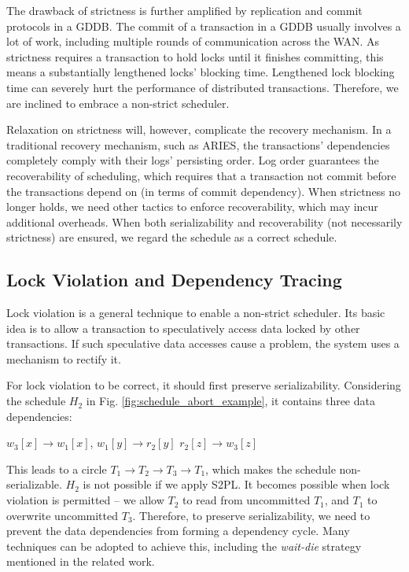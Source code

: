 \documentclass[conference]{IEEEtran}
\begin{document}
The drawback of strictness is further amplified by replication and commit protocols in a GDDB.
The commit of a transaction in a GDDB usually involves a lot of work, including multiple rounds of communication across the WAN.
As strictness requires a transaction to hold locks until it finishes committing, this means a substantially lengthened locks' blocking time.
Lengthened lock blocking time can severely hurt the performance of distributed transactions.
Therefore, we are inclined to embrace a non-strict scheduler.

Relaxation on strictness will, however, complicate the recovery mechanism.
In a traditional recovery mechanism, such as ARIES\cite{ARIES:journals/tods/MohanHLPS92}, the transactions' dependencies completely comply with their logs' persisting order.
Log order guarantees the recoverability of scheduling, which requires that a transaction not commit before the transactions depend on (in terms of commit dependency).
When strictness no longer holds, we need other tactics to enforce recoverability, which may incur additional overheads.
When both serializability and recoverability (not necessarily strictness) are ensured, we regard the schedule as a correct schedule.


\subsection{Lock Violation and Dependency Tracing}

Lock violation is a general technique to enable a non-strict scheduler.
Its basic idea is to allow a transaction to speculatively access data locked by other transactions.
If such speculative data accesses cause a problem, the system uses a mechanism to rectify it.

For lock violation to be correct, it should first preserve serializability.
Considering the schedule ${H_2}$ in Fig. \ref{fig:schedule_abort_example},
it contains three data dependencies:

\begin{center}
${w_3[x] \rightarrow w_1[x]}$,
${w_1[y] \rightarrow r_2[y]}$
${r_2[z] \rightarrow w_3[z]}$
\end{center}

This leads to a circle ${T_1 \rightarrow T_2 \rightarrow T_3 \rightarrow T_1}$, which makes the schedule non-serializable.
${H_2}$ is not possible if we apply S2PL.
It becomes possible when lock violation is permitted -- we allow ${T_2}$ to read from uncommitted ${T_1}$, and ${T_1}$ to overwrite uncommitted ${T_3}$.
Therefore, to preserve serializability, we need to prevent the data dependencies from forming a dependency cycle.
Many techniques can be adopted to achieve this, including the \emph{wait-die} strategy mentioned in the related work.
\end{document}
